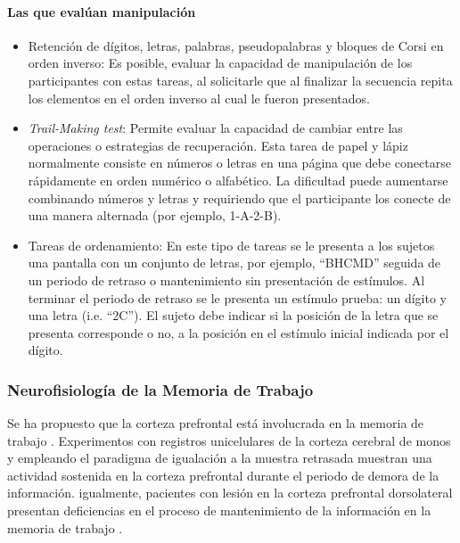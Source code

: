 \documentclass[12pt,letterpaper,final]{article}
\let\cite\cite %
\begin{document}
\paragraph*{Las que evalúan manipulación}
\begin{itemize}


	\item Retención de dígitos, letras, palabras, pseudopalabras y bloques de Corsi en orden inverso:
	Es posible, evaluar la capacidad de manipulación de los participantes con estas tareas, al solicitarle que al finalizar la secuencia repita los elementos en el orden inverso al cual le fueron presentados.

	\item \textit{Trail-Making test}:
	Permite evaluar la capacidad de cambiar entre las operaciones o estrategias de recuperación. Esta tarea de papel y lápiz normalmente consiste en números o letras en una página que debe conectarse rápidamente en orden numérico o alfabético. La dificultad puede aumentarse combinando números y letras y requiriendo que el participante los conecte de una manera alternada (por ejemplo, 1-A-2-B).

	\item Tareas de ordenamiento:
	En este tipo de tareas se le presenta a los sujetos una pantalla con un conjunto de letras, por ejemplo, “BHCMD” seguida de un periodo de retraso o mantenimiento sin presentación de estímulos. Al terminar el periodo de retraso se le presenta un estímulo prueba: un dígito y una letra (i.e. “2C”). El sujeto debe indicar si la posición de la letra que se presenta corresponde o no, a la posición en el estímulo inicial indicada por el dígito.

\end{itemize}


\subsubsection{Neurofisiología de la Memoria de Trabajo}

Se ha propuesto que la corteza prefrontal está involucrada en la memoria de trabajo \cite{DEsposito1999,Liu2010}. Experimentos con registros unicelulares de la corteza cerebral de monos y empleando el paradigma de igualación a la muestra retrasada \cite{Funahashi1989} muestran una actividad sostenida en la corteza prefrontal durante el periodo de demora de la información. igualmente, pacientes con lesión en la corteza prefrontal dorsolateral presentan deficiencias en el proceso de mantenimiento de la información en la memoria de trabajo \cite{Eriksson2015}.
\end{document}
